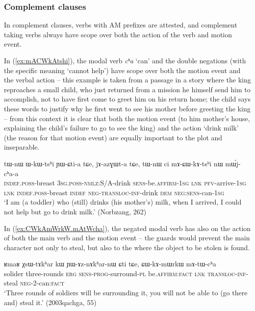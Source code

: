 \documentclass[oneside,a4paper,11pt]{article}
\newcommand{\japhug}[2]{\textit{\phon#1} `#2'}
\begin{document}
\subsubsection{Complement clauses} \label{sec:am.conditional}
In complement clauses, verbs with AM prefixes are attested, and complement taking verbs always have scope over both the action of the verb and motion event.

 
In (\ref{ex:mACWkAtshi}), the modal verb \japhug{cʰa}{can} and the double negations (with the specific meaning `cannot help') have scope over both the motion event and the verbal action -- this example is taken from a passage in a story where the king reproaches a small child, who just returned from a mission he himself send him to accomplish, not to have first come to greet him on his return home; the child says these words to justify why he first went to see his mother before greeting the king -- from this context it is clear that both the motion event (to him mother's house, explaining the child's failure to go to see the king) and the action `drink milk' (the reason for that motion event) are equally important to the plot and inseparable. 

\begin{exe}
\ex \label{ex:mACWkAtshi}
\gll  tɯ-nɯ ɯ-kɯ-tsʰi ɲɯ-ɕti-a tɕe, jɤ-azɣɯt-a tɕe, tɯ-nɯ ci mɤ-ɕɯ-kɤ-tsʰi nɯ mɯ́j-cʰa-a \\
\textsc{indef}.\textsc{poss}-breast \textsc{3sg}.\textsc{poss}-\textsc{nmlz}:S/A-drink \textsc{sens}-be.\textsc{affirm}-\textsc{1sg} \textsc{lnk} \textsc{pfv}-arrive-\textsc{1sg} \textsc{lnk} \textsc{indef}.\textsc{poss}-breast  \textsc{indef} \textsc{neg}-\textsc{transloc}-\textsc{inf}-drink \textsc{dem} \textsc{neg}:\textsc{sens}-can-\textsc{1sg} \\
\glt `I am (a toddler) who (still) drinks (his mother's) milk, when I arrived, I could not help but go to drink milk.'  (Norbzang, 262)
 \end{exe}
 
 In (\ref{ex:CWkAmWrkW.mAtWcha}), the negated modal verb has also on the action of both the main verb and the motion event -- the guards would prevent the main character not only to steal, but also to the where the object to be stolen is found.
 
\begin{exe}
\ex \label{ex:CWkAmWrkW.mAtWcha}
\gll ʁmaʁ χsɯ-tɤkʰar kɯ ɲɯ-ɤz-nɤkʰar-nɯ ɕti tɕe, ɕɯ-kɤ-mɯrkɯ mɤ-tɯ-cʰa  \\
solider three-rounds \textsc{erg} \textsc{sens}-\textsc{prog}-surround-\textsc{pl} be.\textsc{affirm}:\textsc{fact} \textsc{lnk}  \textsc{transloc}-\textsc{inf}-steal \textsc{neg}-2-can:\textsc{fact} \\
\glt `Three rounds of soldiers will be surrounding it, you will not be able to (go there and) steal it.' (2003qachga, 55)
   \end{exe}
 
\end{document}
